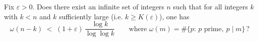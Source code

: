 Fix $\varepsilon>0$. Does there exist an infinite set of integers $n$ such that for all integers $k$ with $k<n$ and $k$ sufficiently large (i.e. $k\ge K(\varepsilon)$), one has
\[
\omega(n-k)\;<\;(1+\varepsilon)\,\frac{\log k}{\log\log k}
\qquad\text{where }\omega(m)=\#\{p:\,p\text{ prime},\ p\mid m\}\,?
\]
